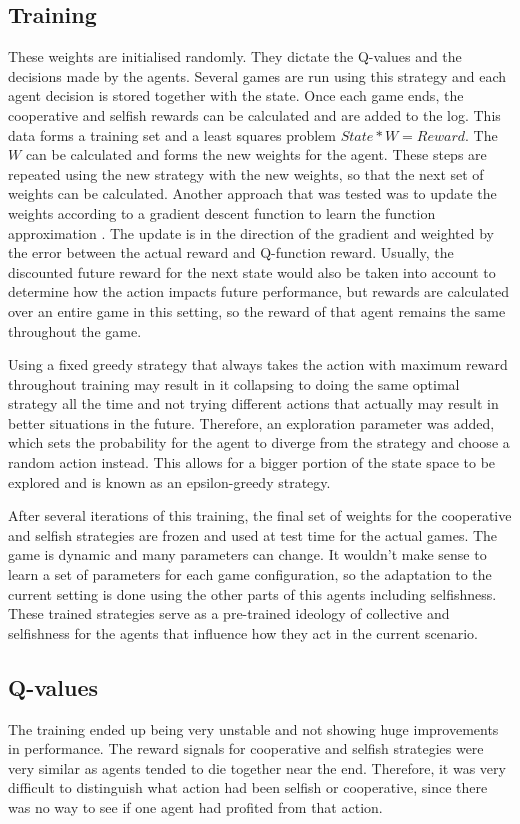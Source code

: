 \subsection{Training}
These weights are initialised randomly. They dictate the Q-values and the decisions made by the agents. Several games are run using this strategy and each agent decision is stored together with the state. Once each game ends, the cooperative and selfish rewards can be calculated and are added to the log. This data forms a training set and a least squares problem $State * W = Reward$. The $W$ can be calculated and forms the new weights for the agent. These steps are repeated using the new strategy with the new weights, so that the next set of weights can be calculated. Another approach that was tested was to update the weights according to a gradient descent function to learn the function approximation \citep{qlearnatari}. The update is in the direction of the gradient and weighted by the error between the actual reward and Q-function reward. Usually, the discounted future reward for the next state would also be taken into account to determine how the action impacts future performance, but rewards are calculated over an entire game in this setting, so the reward of that agent remains the same throughout the game.

Using a fixed greedy strategy that always takes the action with maximum reward throughout training may result in it collapsing to doing the same optimal strategy all the time and not trying different actions that actually may result in better situations in the future. Therefore, an exploration parameter was added, which sets the probability for the agent to diverge from the strategy and choose a random action instead. This allows for a bigger portion of the state space to be explored and is known as an epsilon-greedy strategy.

After several iterations of this training, the final set of weights for the cooperative and selfish strategies are frozen and used at test time for the actual games. The game is dynamic and many parameters can change. It wouldn't make sense to learn a set of parameters for each game configuration, so the adaptation to the current setting is done using the other parts of this agents including selfishness. These trained strategies serve as a pre-trained ideology of collective and selfishness for the agents that influence how they act in the current scenario.

\subsection{Q-values}
The training ended up being very unstable and not showing huge improvements in performance. The reward signals for cooperative and selfish strategies were very similar as agents tended to die together near the end. Therefore, it was very difficult to distinguish what action had been selfish or cooperative, since there was no way to see if one agent had profited from that action.


